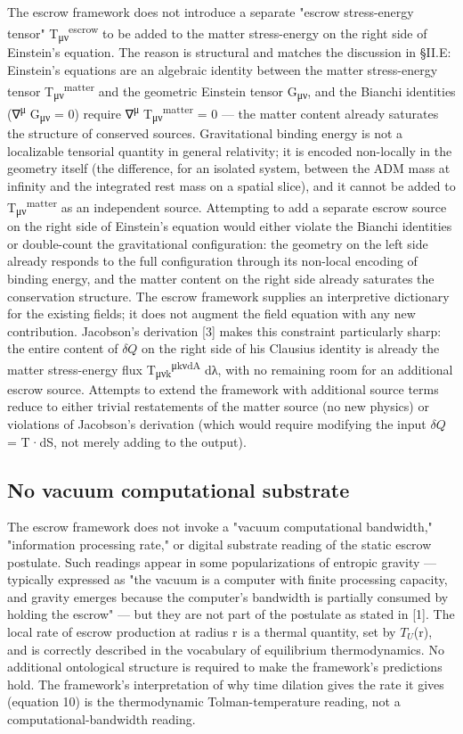 \documentclass[11pt]{article}
\begin{document}
The escrow framework does not introduce a separate "escrow
stress-energy tensor" T\textsubscript{μν}\textsuperscript{escrow} to be added to the matter
stress-energy on the right side of Einstein's equation. The reason is
structural and matches the discussion in §II.E: Einstein's equations
are an algebraic identity between the matter stress-energy tensor
T\textsubscript{μν}\textsuperscript{matter} and the geometric Einstein tensor G\textsubscript{μν}, and the Bianchi
identities (∇\textsuperscript{μ} G\textsubscript{μν} = 0) require ∇\textsuperscript{μ} T\textsubscript{μν}\textsuperscript{matter} = 0 --- the matter
content already saturates the structure of conserved sources.
Gravitational binding energy is not a localizable tensorial quantity in
general relativity; it is encoded non-locally in the geometry itself
(the difference, for an isolated system, between the ADM mass at
infinity and the integrated rest mass on a spatial slice), and it cannot
be added to T\textsubscript{μν}\textsuperscript{matter} as an independent source. Attempting to add a
separate escrow source on the right side of Einstein's equation would
either violate the Bianchi identities or double-count the gravitational
configuration: the geometry on the left side already responds to the
full configuration through its non-local encoding of binding energy, and
the matter content on the right side already saturates the conservation
structure. The escrow framework supplies an interpretive dictionary for
the existing fields; it does not augment the field equation with any new
contribution. Jacobson's derivation [3] makes this constraint
particularly sharp: the entire content of $\delta Q$ on the right side of his
Clausius identity is already the matter stress-energy flux
T\textsubscript{μνk}\textsuperscript{μk}\textsuperscript{νdA} dλ, with no remaining room for an additional escrow
source. Attempts to extend the framework with additional source terms
reduce to either trivial restatements of the matter source (no new
physics) or violations of Jacobson's derivation (which would require
modifying the input $\delta Q$ = T·dS, not merely adding to the output).


\subsection{No vacuum computational substrate}

The escrow framework does not invoke a "vacuum computational
bandwidth," "information processing rate," or digital substrate
reading of the static escrow postulate. Such readings appear in some
popularizations of entropic gravity --- typically expressed as "the
vacuum is a computer with finite processing capacity, and gravity
emerges because the computer's bandwidth is partially consumed by
holding the escrow" --- but they are not part of the postulate as
stated in [1]. The local rate of escrow production at radius r is a
thermal quantity, set by $T_{U}$(r), and is correctly described in the
vocabulary of equilibrium thermodynamics. No additional ontological
structure is required to make the framework's predictions hold. The
framework's interpretation of why time dilation gives the rate it gives
(equation 10) is the thermodynamic Tolman-temperature reading, not a
computational-bandwidth reading.
\end{document}
